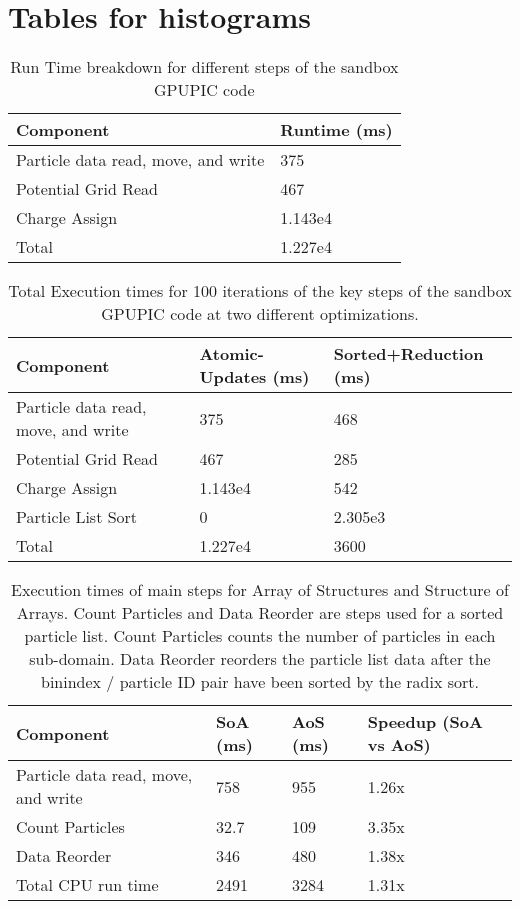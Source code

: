 \chapter{Tables for histograms}


\begin{table}[ht]
\begin{tabular}{| p{4.0cm} | p{3.5cm} |}
\hline
Component & Runtime (ms) \\ \hline
Particle data read, move, and write & 375 \\ \hline
Potential Grid Read & 467 \\ \hline
Charge Assign & 1.143e4  \\ \hline
Total & 1.227e4  \\ \hline
\end{tabular}
\caption[Sandbox GPUPIC Run Time Profile]{Run Time breakdown for different steps of the sandbox GPUPIC code}
\label{tab:GPUPIC_basetime} 
\end{table}


\begin{table}[ht]
\begin{tabular}{| p{4.0cm} | p{3.5cm} | p{3.5cm} |}
\hline
Component & Atomic-Updates (ms) & Sorted+Reduction (ms) \\ \hline
Particle data read, move, and write & 375 & 468 \\ \hline
Potential Grid Read & 467 & 285 \\ \hline
Charge Assign & 1.143e4 & 542 \\ \hline
Particle List Sort & 0 & 2.305e3 \\ \hline
Total & 1.227e4 & 3600 \\ \hline
\end{tabular}
\caption[Sandbox GPUPIC Move Kernel Optimization]{Total Execution times for 100 iterations of the key steps of the sandbox GPUPIC code at two different optimizations.}
\label{tab:GPUPIC_comparison}
\end{table}

\begin{table}[ht]
\begin{tabular}{| p{4.0cm} | p{3.5cm} | p{2.5cm} | p{4.0cm} |}
\hline
Component & SoA (ms) & AoS (ms) & Speedup (SoA vs AoS) \\ \hline
Particle data read, move, and write & 758 & 955 & 1.26x \\ \hline
Count Particles & 32.7 & 109 & 3.35x \\ \hline
Data Reorder & 346 & 480 & 1.38x \\ \hline
Total CPU run time & 2491 & 3284 & 1.31x \\ \hline
\end{tabular}
\caption[CPU and GPU Runtime comparison]{Execution times of main steps for Array of Structures and Structure of Arrays. Count Particles and Data Reorder are steps used for a sorted particle list. Count Particles counts the number of particles in each sub-domain. Data Reorder reorders the particle list data after the binindex / particle ID pair have been sorted by the radix sort.}
\label{tab:struct_compare} 
\end{table}

